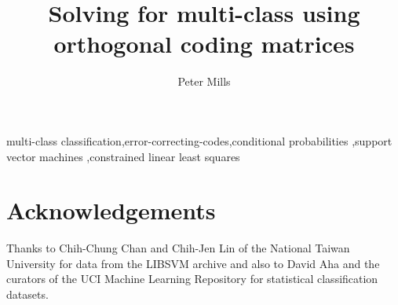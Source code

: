 \documentclass[twocolumn,final,authoryear]{elsarticle}
\begin{document}
\clearpage


\ifpreprint
  \setcounter{page}{1}
\else
  \setcounter{page}{1}
\fi

\begin{frontmatter}

	\title{Solving for multi-class using orthogonal coding matrices}

\author{Peter Mills}

\address{1159 Meadowlane\\Cumberland ON\\K4C 1C3\\Canada}




\begin{abstract}
	
\end{abstract}

\begin{keyword}
multi-class classification\sep error-correcting-codes\sep conditional probabilities \sep support vector machines \sep constrained linear least squares

\end{keyword}

\end{frontmatter}




\section*{Acknowledgements}

Thanks to Chih-Chung Chan and Chih-Jen Lin of the National Taiwan University
for data from the LIBSVM archive and also to David Aha and the curators of
the UCI Machine Learning Repository for statistical classification datasets.



%
\end{document}
